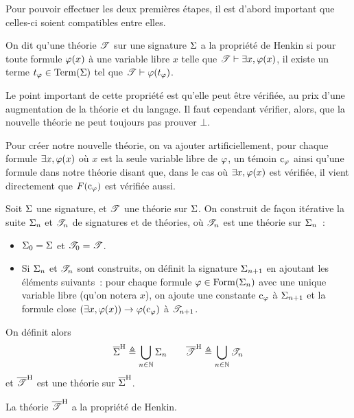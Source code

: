 Pour pouvoir effectuer les deux premières étapes, il est d'abord
important que celles-ci soient compatibles entre elles.

\begin{definition}
  On dit qu'une théorie $\mathscr T$ sur une signature $\Sigma$ a la propriété
  de Henkin si pour toute formule $\varphi(x)$ à une variable libre $x$
  telle que $\mathscr T\vdash\exists x, \varphi(x)$, il existe un terme
  $t_{\varphi}\in\operatorname{Term}(\Sigma)$ tel que $\mathscr T\vdash \varphi(t_{\varphi})$.
\end{definition}

Le point important de cette propriété est qu'elle peut être vérifiée, au prix
d'une augmentation de la théorie et du langage. Il faut cependant vérifier,
alors, que la nouvelle théorie ne peut toujours pas prouver $\bot$.

Pour créer notre nouvelle théorie, on va ajouter artificiellement, pour chaque
formule $\exists x, \varphi(x)$ où $x$ est la seule variable libre de $\varphi$,
un témoin
$\mathrm{c}_{\varphi}$ ainsi qu'une formule dans notre théorie disant que, dans le cas où
$\exists x, \varphi(x)$ est vérifiée, il vient directement que
$F(\mathrm{c}_{\varphi})$ est vérifiée aussi.

\begin{definition}
  Soit $\Sigma$ une signature, et $\mathscr T$ une théorie sur $\Sigma$. On
  construit de façon itérative la suite $\Sigma_n$ et $\mathscr T_n$ de
  signatures et de théories, où $\mathscr T_n$ est une théorie sur $\Sigma_n$~:
  \begin{itemize}
  \item $\Sigma_0 = \Sigma$ et $\mathscr T_0 = \mathscr T$.
  \item Si $\Sigma_n$ et $\mathscr T_n$ sont construits, on définit la signature
    $\Sigma_{n+1}$ en ajoutant les éléments suivants~: pour chaque formule
    $\varphi \in \operatorname{Form}(\Sigma_n)$ avec une unique variable libre
    (qu'on notera $x$), on ajoute une constante $\mathrm{c}_{\varphi}$ à
    $\Sigma_{n+1}$ et la
    formule close $(\exists x, \varphi(x))\to \varphi(\mathrm{c}_{\varphi})$ à
    $\mathscr T_{n+1}$.
  \end{itemize}
  On définit alors
  \[\overline{\Sigma}^{\mathrm H}\triangleq \bigcup_{n\in\mathbb N}\Sigma_n
  \qquad\overline{\mathscr T}^{\mathrm H} \triangleq \bigcup_{n \in \mathbb N}\mathscr T_n\]
  et $\overline{\mathscr T}^{\mathrm H}$ est une théorie sur $\overline{\Sigma}^{\mathrm H}$.
\end{definition}

\begin{property}
  La théorie $\overline{\mathscr T}^{\mathrm H}$ a la propriété de Henkin.
\end{property}

